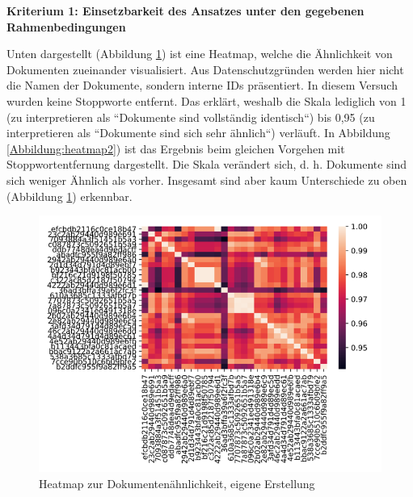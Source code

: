 {\bf Kriterium 1: Einsetzbarkeit des Ansatzes unter den gegebenen Rahmenbedingungen}

Unten dargestellt (Abbildung \ref{Abbildung:heatmap1}) ist eine Heatmap, welche die Ähnlichkeit von Dokumenten zueinander visualisiert. Aus Datenschutzgründen werden hier nicht die Namen der Dokumente, sondern interne IDs präsentiert. In diesem Versuch wurden keine Stoppworte entfernt. Das erklärt, weshalb die Skala lediglich von 1 (zu interpretieren als ``Dokumente sind vollständig identisch``) bis 0,95 (zu interpretieren als ``Dokumente sind sich sehr ähnlich``) verläuft. In Abbildung \ref{Abbildung:heatmap2}) ist das Ergebnis beim gleichen Vorgehen mit Stoppwortentfernung dargestellt. Die Skala verändert sich, d. h. Dokumente sind sich weniger Ähnlich als vorher. Insgesamt sind aber kaum Unterschiede zu oben (Abbildung \ref{Abbildung:heatmap1}) erkennbar. 
 
\begin{figure}[]
\centering
\includegraphics[scale=0.95]{content/pics/Picture_12.png}
\caption{Heatmap zur Dokumentenähnlichkeit, eigene Erstellung}
\label{Abbildung:heatmap1}
\end{figure}

